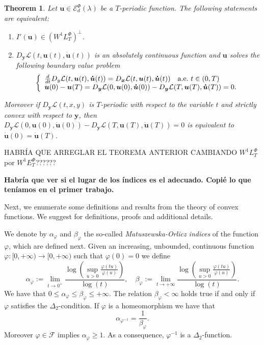 \documentclass[twoside]{article}
\newtheorem{thm}{Theorem}[section]
\theoremstyle{remark}
\newcommand{\lphi}{L^{\Phi}}
\newcommand{\ephi}{E^{\Phi}}
\newcommand{\wphi}{W^{1}\lphi}
\newcommand{\wphiet}{W^{1}\ephi_T}
\newcommand{\domi}{\mathcal{E}^{\Phi}_d(\lambda)}
\renewcommand{\b}[1]{\boldsymbol{#1}}
\renewcommand{\leq}{\leqslant}
\renewcommand{\geq}{\geqslant}
\begin{document}
\begin{thm}\label{critpoint} Let $\b{u}\in\domi$ be  a $T$-periodic function. The following statements are equivalent:
\begin{enumerate}
 \item $I'(\b{u})\in\left( \wphi_T\right)^{\perp}$.
 \item  $D_{\b{y}}\mathcal{L}(t,\b{u}(t),\b{\dot{u}}(t))$ is an absolutely continuous function and $\b{u}$ solves the following boundary value problem
 \begin{equation}\label{ecualagran2}
    \left\{%
\begin{array}{ll}
   \frac{d}{dt} D_{y}\mathcal{L}(t,\b{u}(t),\b{\dot{u}}(t))= D_{\b{x}}\mathcal{L}(t,\b{u}(t),\b{\dot{u}}(t)) \quad \hbox{a.e.}\ t \in (0,T)\\
    \b{u}(0)-\b{u}(T)=D_{\b{y}}\mathcal{L}(0,\b{u}(0),\b{\dot{u}}(0))-D_{\b{y}}\mathcal{L}(T,\b{u}(T),\b{\dot{u}}(T))=0.
\end{array}%
\right.
\end{equation}
\end{enumerate}
Moreover if $D_{\b{y}}\mathcal{L}(t,x,y)$ is $T$-periodic with respect to the variable $t$ and strictly convex with respect to $\b{y}$, then
$D_{\b{y}}\mathcal{L}(0,\b{u}(0),\b{\b{\dot{\b{u}}}}(0))-D_{\b{y}}\mathcal{L}(T,\b{u}(T),\b{\dot{u}}(T))=0$ is equivalent to $\b{\dot{u}}(0)=\b{\dot{u}}(T)$.
\end{thm}

HABR\'IA QUE ARREGLAR EL TEOREMA ANTERIOR CAMBIANDO $\wphi_T$ por $\wphiet$??????

{\bf Habr\'ia que ver si el lugar de los \'indices es el adecuado. Copi\'e lo que ten\'iamos en el 
primer trabajo.}


Next, we enumerate some definitions and results from the theory of convex functions. 
We suggest \cite{FK97, GP77, KR, M, rao1991theory} for definitions, proofs and additional details.

We denote by $\alpha_{\varphi}$ and $\beta_{\varphi}$ the so-called  \emph{Matuszewska-Orlicz indices} of the function $\varphi$, which are defined next. Given
an increasing, unbounded, continuous function  \linebreak $\varphi:[ 0,+\infty)\to [0,+\infty)$ such that $\varphi(0)=0$ we define
\begin{equation}\label{MO_indices}
    \alpha_{\varphi}:=\lim\limits_{t\to 0^{+}}\frac{\log \left (\sup\limits_{u>0}\frac{\varphi(t u)}{\varphi(u)} \right ) }{\log(t)},\quad
    \beta_{\varphi}:=\lim\limits_{t\to +\infty}\frac{\log \left  (\sup\limits_{u>0}\frac{\varphi(t u)}{\varphi(u)}\right )}{\log(t)}.
\end{equation}
We have that $0\leq \alpha_{\varphi}\leq \beta_{\varphi}\leq +\infty$. The relation $\beta_{\varphi}<\infty$ holds true if and only if $\varphi$ satisfies the $\Delta_2$-condition. If $\varphi$ is a homeomorphism  we have that
\begin{equation}\label{inv_indices}
    \alpha_{\varphi^{-1}}=\frac{1}{\beta_{\varphi}}.
\end{equation}
Moreover $\varphi\in\mathcal{F}$ implies  $\alpha_{\varphi}\geq 1$. As a consequence, $\varphi^{-1}$ is a $\Delta_2$-function.
\end{document}
